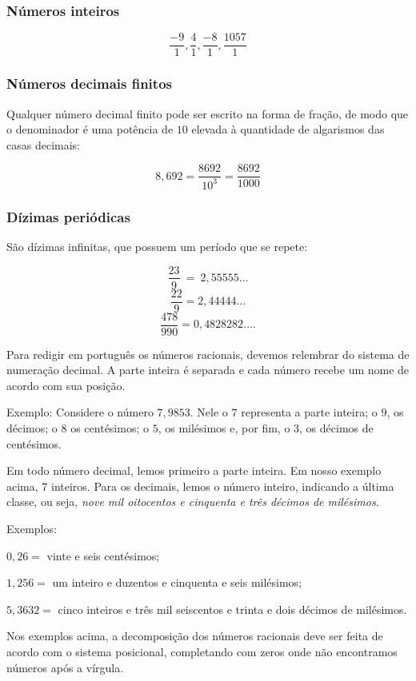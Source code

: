 {\subsubsection*{Números inteiros}

 $$\frac{-9}{1},  \frac{4}{1}, \frac{-8}{1},  \frac{1057}{1}$$

\subsubsection*{Números decimais finitos} Qualquer número decimal finito pode ser
escrito na forma de fração, de modo que o denominador é uma potência de
$10$ elevada à quantidade de algarismos das casas decimais:

$$8,692  = \frac{8692}{10^{3}} = \frac{8692}{1000}$$

\subsubsection*{Dízimas periódicas} 
São dízimas infinitas, que possuem um período que se repete: 

$$\frac{23}{9}\  = \ 2,55555\ldots{}$$
$$\frac{22}{9} = 2,44444\ldots{}$$
$$\frac{478}{990} = 0,4828282\ldots{}.$$

Para redigir em português os números racionais, devemos relembrar do
sistema de numeração decimal. A parte inteira é separada e cada número
recebe um nome de acordo com sua posição.

\medskip\noindent Exemplo: Considere o número 
$7,9853$. Nele o $7$ representa a parte inteira; o $9$, os décimos; o $8$ os centésimos; o $5$, os milésimos e, por fim, o $3$,
os décimos de centésimos.

Em todo número decimal, lemos primeiro a parte inteira. Em nosso exemplo acima, 7
inteiros. Para os decimais, lemos o número inteiro, indicando a última
classe, ou seja, \textit{nove mil oitocentos e cinquenta e três décimos de
milésimos}.

\medskip\noindent Exemplos:

$0,26 =$ vinte e seis centésimos;

$1,256 =$ um inteiro e duzentos e cinquenta e seis milésimos;

$5,3632 =$ cinco inteiros e três mil seiscentos e trinta e dois décimos de
milésimos.


\medskip
Nos exemplos acima, a decomposição dos números racionais deve ser feita de 
acordo com o sistema posicional, completando com zeros onde não encontramos 
números após a vírgula.

}
